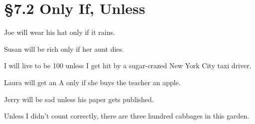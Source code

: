 % 
% 

\section{\S 7.2 Only If, Unless}
\begin{enumerate}

	\begin{statement}{Joe will wear his hat only if it rains.}
	\end{statement}

	\begin{statement}{Susan will be rich only if her aunt dies.}
	\end{statement}

	\begin{statement}{I will live to be 100 unless I get hit by a sugar-crazed New
			York City taxi driver.}
	\end{statement}

	\begin{statement}{Laura will get an A only if she buys the teacher an apple.}
	\end{statement}

	\begin{statement}{Jerry will be sad unless his paper gets published.}
	\end{statement}

	\begin{statement}{Unless I didn’t count correctly, there are three hundred cabbages in this garden.}
	\end{statement}

\end{enumerate}
% 
